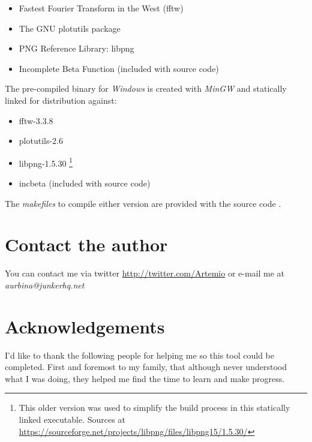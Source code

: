 \documentclass[10pt,a4paper]{report}
\begin{document}
\begin{appendices}
\begin{itemize}
	\item Fastest Fourier Transform in the West (fftw) \cite{fftw}
	\item The GNU plotutils package \cite{libplot}
	\item PNG Reference Library: libpng \cite{libpng}
	\item Incomplete Beta Function \cite{betafunction} (included with source code)
\end{itemize}

The pre-compiled binary for \textit{Windows} is created with \textit{MinGW}\cite{mingw} and statically linked for distribution against:

\begin{itemize}
	\item fftw-3.3.8 \cite{fftw}
	\item plotutils-2.6 \cite{libplot}
	\item libpng-1.5.30 \footnote{This older version was used to simplify the build process in this statically linked executable. Sources at \url{https://sourceforge.net/projects/libpng/files/libpng15/1.5.30/}}
	\item incbeta \cite{betafunction} (included with source code)
\end{itemize}

The \textit{makefiles} to compile either version are provided with the source code \cite{sourcecode}.

\chapter{Contact the author}
\label{contact}

You can contact me via twitter \url{http://twitter.com/Artemio} or e-mail me at \textit{aurbina@junkerhq.net}

\chapter{Acknowledgements}

I'd like to thank the following people for helping me so this tool could be completed. First and foremost to my family, that although never understood what I was doing, they helped me find the time to learn and make progress.

\end{appendices}
\end{document}
